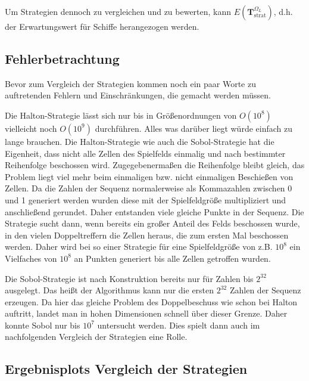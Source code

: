 \documentclass[a4paper,12pt]{llncs}
\numberwithin{equation}{section}
\DeclareMathOperator{\strat}{strat}
\begin{document}
Um Strategien dennoch zu vergleichen und zu bewerten, kann $E(\mathbf{T}^{\Omega_L}_{\strat})$, d.h. der Erwartungswert für Schiffe herangezogen werden.

\subsection{Fehlerbetrachtung}
Bevor zum Vergleich der Strategien kommen noch ein paar Worte zu auftretenden Fehlern und Einschränkungen, die gemacht werden müssen. 

Die Halton-Strategie lässt sich nur bis in Größenordnungen von $O(10^8)$ vielleicht noch $O(10^9)$ durchführen. Alles was darüber liegt würde einfach zu lange brauchen. Die Halton-Strategie wie auch die Sobol-Strategie hat die Eigenheit, dass nicht alle Zellen des Spielfelds einmalig und nach bestimmter Reihenfolge beschossen wird. Zugegebenermaßen die Reihenfolge bleibt gleich, das Problem liegt viel mehr beim einmaligen bzw. nicht einmaligen Beschießen von Zellen. Da die Zahlen der Sequenz normalerweise als Kommazahlen zwischen 0 und 1 generiert werden wurden diese mit der Spielfeldgröße multipliziert und anschließend gerundet. Daher entstanden viele gleiche Punkte in der Sequenz. Die Strategie sucht dann, wenn bereits ein großer Anteil des Felds beschossen wurde, in den vielen Doppeltreffern die Zellen heraus, die zum ersten Mal beschossen werden. Daher wird bei so einer Strategie für eine Spielfeldgröße von z.B. $10^8$ ein Vielfaches von $10^8$ an Punkten generiert bis alle Zellen getroffen wurden.

Die Sobol-Strategie ist nach Konstruktion bereits nur für Zahlen bis $2^{32}$ ausgelegt. Das heißt der Algorithmus kann nur die ersten $2^{32}$ Zahlen der Sequenz erzeugen. Da hier das gleiche Problem des Doppelbeschuss wie schon bei Halton auftritt, landet man in hohen Dimensionen schnell über dieser Grenze. Daher konnte Sobol nur bis $10^7$ untersucht werden. Dies spielt dann auch im nachfolgenden Vergleich der Strategien eine Rolle.

\subsection{Ergebnisplots Vergleich der Strategien}

\begin{landscape}
	\label{fig:compare1}
	
\end{landscape}

\begin{landscape}
	\label{fig:compare2}
	
\end{landscape}
\end{document}
